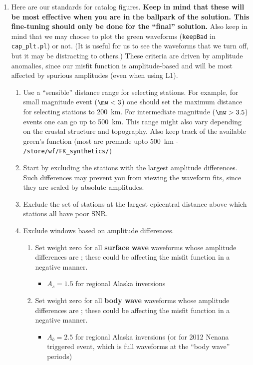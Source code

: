 \begin{enumerate}

\item Here are our standards for catalog figures. {\bf Keep in mind that these will be most effective when you are in the ballpark of the solution. This fine-tuning should only be done for the ``final'' solution.} Also keep in mind that we may choose to plot the green waveforms (\verb+keepBad+ in \verb+cap_plt.pl+) or not. (It is useful for us to see the waveforms that we turn off, but it may be distracting to others.) These criteria are driven by amplitude anomalies, since our misfit function is amplitude-based and will be most affected by spurious amplitudes (even when using L1).
%
\begin{enumerate}
\item Use a ``sensible'' distance range for selecting stations. For example, for small magnitude event ($\mw < 3$) one should set the maximum distance for selecting stations to 200~km. For intermediate magnitude ($\mw > 3.5$) events one can go up to 500~km. This range might also vary depending on the crustal structure and topography. Also keep track of the available green's function (most are premade upto 500~km - \verb+/store/wf/FK_synthetics/+)

\item Start by excluding the stations with the largest amplitude differences. Such differences may prevent you from viewing the waveform fits, since they are scaled by absolute amplitudes.

\item Exclude the set of stations at the largest epicentral distance above which stations all have poor SNR.

\item Exclude windows based on amplitude differences.
%
\begin{enumerate}
\item Set weight zero for all {\bf surface wave} waveforms whose amplitude differences are ; these could be affecting the misfit function in a negative manner.
\begin{itemize}
\item $A_s = 1.5$ for regional Alaska inversions
\end{itemize}

\item Set weight zero for all {\bf body wave} waveforms whose amplitude differences are ; these could be affecting the misfit function in a negative manner.
\begin{itemize}
\item $A_b = 2.5$ for regional Alaska inversions (or for 2012 Nenana triggered event, which is full waveforms at the ``body wave'' periods)


\end{itemize}
\end{enumerate}
\end{enumerate}
\end{enumerate}
